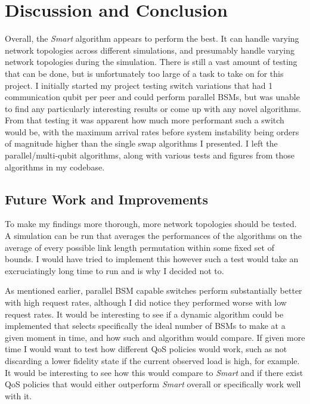 \section{Discussion and Conclusion}
Overall, the \textit{Smart} algorithm appears to perform the best.
It can handle varying network topologies across different simulations, and presumably handle varying network topologies during the simulation.
There is still a vast amount of testing that can be done, but is unfortunately too large of a task to take on for this project.
I initially started my project testing switch variations that had 1 communication qubit per peer and could perform parallel BSMs,
but was unable to find any particularly interesting results or come up with any novel algorithms.
From that testing it was apparent how much more performant such a switch would be, with the maximum arrival rates before system instability
being orders of magnitude higher than the single swap algorithms I presented.
I left the parallel/multi-qubit algorithms, along with various tests and figures from those algorithms in my codebase.
\subsection{Future Work and Improvements}
To make my findings more thorough, more network topologies should be tested.
A simulation can be run that averages the performances of the algorithms on the average of every possible link length permutation within some fixed set of bounds.
I would have tried to implement this however such a test would take an excruciatingly long time to run and is why I decided not to.

As mentioned earlier, parallel BSM capable switches perform substantially better with high request rates, although I did notice they performed worse with low request rates.
It would be interesting to see if a dynamic algorithm could be implemented that selects specifically the ideal number of BSMs to make at a given moment in time, and how such and algorithm would compare.
If given more time I would want to test how different QoS policies would work, such as not discarding a lower fidelity state if the current observed load is high, for example.
It would be interesting to see how this would compare to \textit{Smart} and if there exist QoS policies that would either outperform \textit{Smart} overall or specifically work well with it.